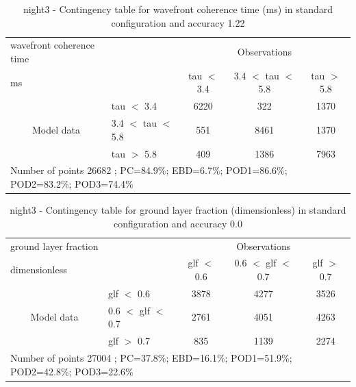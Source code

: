 \begin{table}[p!]
\begin{center}
\begin{tabular}{llccc}
\hline
{wavefront coherence time}                                       &                                                    & \multicolumn{3}{c}{Observations}                 \\
{ms}                                       &                             & tau $<$ 3.4   & 3.4 $<$ tau $<$ 5.8 & tau $>$ 5.8 \\
\hline
\multicolumn{1}{c}{\multirow{3}{*}{Model data}}  & tau $<$ 3.4             & 6220                & 322                       & 1370              \\
                                                 & 3.4  $<$ tau $<$ 5.8 & 551                & 8461                       & 1370              \\
                                                 & tau $>$ 5.8             & 409                & 1386                       & 7963              \\
\hline
\multicolumn{5}{l}{ Number of points        26682 ; PC=84.9\%; EBD=6.7\%; POD1=86.6\%; POD2=83.2\%; POD3=74.4\%}
\end{tabular}
\end{center}
\caption{night3 - Contingency table for  wavefront coherence time (ms) in standard configuration and accuracy 1.22}
\label{tab:contingencytauBEF:night3}
\end{table}
\clearpage
\begin{table}[p!]
\begin{center}
\begin{tabular}{llccc}
\hline
{ground layer fraction}                                       &                                                    & \multicolumn{3}{c}{Observations}                 \\
{dimensionless}                                       &                             & glf $<$ 0.6   & 0.6 $<$ glf $<$ 0.7 & glf $>$ 0.7 \\
\hline
\multicolumn{1}{c}{\multirow{3}{*}{Model data}}  & glf $<$ 0.6             & 3878                & 4277                       & 3526              \\
                                                 & 0.6  $<$ glf $<$ 0.7 & 2761                & 4051                       & 4263              \\
                                                 & glf $>$ 0.7             & 835                & 1139                       & 2274              \\
\hline
\multicolumn{5}{l}{ Number of points        27004 ; PC=37.8\%; EBD=16.1\%; POD1=51.9\%; POD2=42.8\%; POD3=22.6\%}
\end{tabular}
\end{center}
\caption{night3 - Contingency table for  ground layer fraction (dimensionless) in standard configuration and accuracy 0.0}
\label{tab:contingencyglfBEF:night3}
\end{table}
